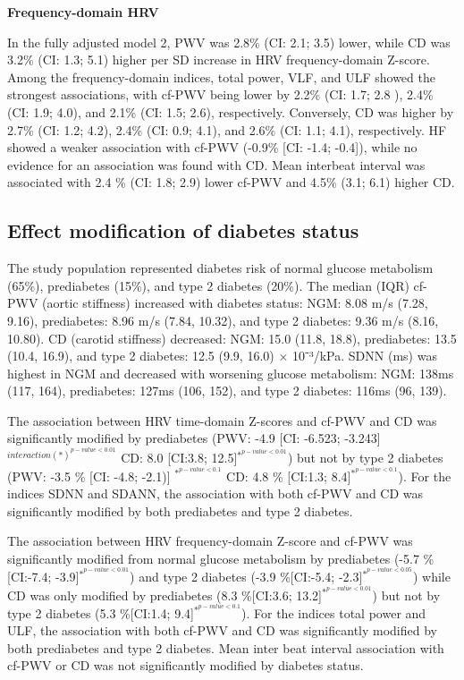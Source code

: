 \documentclass[
  a4paper,
  headsepline=true,
  open=any]{scrbook}
\begin{document}
\textbf{Frequency-domain HRV}

In the fully adjusted model 2, PWV was 2.8\% (CI: 2.1; 3.5) lower, while
CD was 3.2\% (CI: 1.3; 5.1) higher per SD increase in HRV
frequency-domain Z-score. Among the frequency-domain indices, total
power, VLF, and ULF showed the strongest associations, with cf-PWV being
lower by 2.2\% (CI: 1.7; 2.8 ), 2.4\% (CI: 1.9; 4.0), and 2.1\% (CI:
1.5; 2.6), respectively. Conversely, CD was higher by 2.7\% (CI: 1.2;
4.2), 2.4\% (CI: 0.9; 4.1), and 2.6\% (CI: 1.1; 4.1), respectively. HF
showed a weaker association with cf-PWV (-0.9\% {[}CI: -1.4; -0.4{]}),
while no evidence for an association was found with CD. Mean interbeat
interval was associated with 2.4 \% (CI: 1.8; 2.9) lower cf-PWV and
4.5\% (3.1; 6.1) higher CD.

\hypertarget{effect-modification-of-diabetes-status}{%
\subsection{Effect modification of diabetes
status}\label{effect-modification-of-diabetes-status}}

The study population represented diabetes risk of normal glucose
metabolism (65\%), prediabetes (15\%), and type 2 diabetes (20\%). The
median (IQR) cf-PWV (aortic stiffness) increased with diabetes status:
NGM: 8.08 m/s (7.28, 9.16), prediabetes: 8.96 m/s (7.84, 10.32), and
type 2 diabetes: 9.36 m/s (8.16, 10.80). CD (carotid stiffness)
decreased: NGM: 15.0 (11.8, 18.8), prediabetes: 13.5 (10.4, 16.9), and
type 2 diabetes: 12.5 (9.9, 16.0) × 10⁻³/kPa. SDNN (ms) was highest in
NGM and decreased with worsening glucose metabolism: NGM: 138ms (117,
164), prediabetes: 127ms (106, 152), and type 2 diabetes: 116ms (96,
139).

The association between HRV time-domain Z-scores and cf-PWV and CD was
significantly modified by prediabetes (PWV: -4.9 {[}CI: -6.523;
-3.243{]} \(^{interaction(*) ^{p-value< 0.01}}\) CD: 8.0 {[}CI:3.8;
12.5{]}\(^{*^{p-value< 0.01}}\)) but not by type 2 diabetes (PWV: -3.5
\% {[}CI: -4.8; -2.1){]} \(^{*^{p-value< 0.1}}\) CD: 4.8 \% {[}CI:1.3;
8.4{]}\(^{*^{p-value< 0.1}}\)). For the indices SDNN and SDANN, the
association with both cf-PWV and CD was significantly modified by both
prediabetes and type 2 diabetes.

The association between HRV frequency-domain Z-score and cf-PWV was
significantly modified from normal glucose metabolism by prediabetes
(-5.7 \%{[}CI:-7.4; -3.9{]}\(^{*^{p-value< 0.01}}\)) and type 2 diabetes
(-3.9 \%{[}CI:-5.4; -2.3{]}\(^{*^{p-value< 0.05}}\)) while CD was only
modified by prediabetes (8.3 \%{[}CI:3.6;
13.2{]}\(^{*^{p-value< 0.01}}\)) but not by type 2 diabetes (5.3
\%{[}CI:1.4; 9.4{]}\(^{*^{p-value< 0.1}}\)). For the indices total power
and ULF, the association with both cf-PWV and CD was significantly
modified by both prediabetes and type 2 diabetes. Mean inter beat
interval association with cf-PWV or CD was not significantly modified by
diabetes status.
\end{document}
